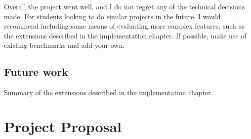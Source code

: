 \documentclass[12pt,a4paper,oneside,openright]{report}
\begin{document}
Overall the project went well, and I do not regret any of the
technical decisions made. For students looking to do similar projects
in the future, I would recommend including some means of evaluating
more complex features, such as the extensions described in the
implementation chapter. If possible, make use of existing benchmarks
and add your own.

\section{Future work}
\label{sec:conc:future-work}

Summary of the extensions described in the implementation chapter.



\appendix

\chapter{Project Proposal}
\end{document}
